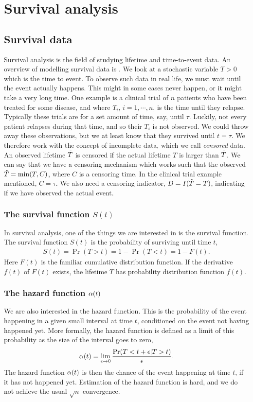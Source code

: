 \chapter{Survival analysis}

\section{Survival data}
Survival analysis is the field of studying lifetime and time-to-event data. An overview of modelling survival data is \citet{ABG}. We look at a stochastic variable $T>0$ which is the time to event. To observe such data in real life, we must wait until the event actually happens. This might in some cases never happen, or it might take a very long time. One example is a clinical trial of $n$ patients who have been treated for some disease, and where $T_i$, $i=1,\cdots,n$, is the time until they relapse. Typically these trials are for a set amount of time, say, until $\tau$. Luckily, not every patient relapses during that time, and so their $T_i$ is not observed. We could throw away these observations, but we at least know that they survived until $t=\tau$. We therefore work with the concept of incomplete data, which we call \textit{censored} data. An observed lifetime $\tilde{T}$ is censored if the actual lifetime $T$ is larger than $\tilde{T}$. We can say that we have a censoring mechanism which works such that the observed $\tilde{T}=\min(T, C)$, where $C$ is a censoring time. In the clinical trial example mentioned, $C=\tau$. We also need a censoring indicator, $D=I(\tilde{T}=T)$, indicating if we have observed the actual event.

\subsection{The survival function $S(t)$}
In survival analysis, one of the things we are interested in is the survival function. The survival function $S(t)$ is the probability of surviving until time $t$,
\begin{align*}
    S(t)=\Pr(T>t)=1-\Pr(T<t)=1-F(t).
\end{align*}
Here $F(t)$ is the familiar cumulative distribution function. If the derivative $f(t)$ of $F(t)$ exists, the lifetime $T$ has probability distribution function $f(t)$.

\subsection{The hazard function $\alpha(t)$}
We are also interested in the hazard function. This is the probability of the event happening in a given small interval at time $t$, conditioned on the event not having happened yet. More formally, the hazard function is defined as a limit of this probability as the size of the interval goes to zero,
\begin{equation*}
    \alpha(t)=\lim_{\epsilon\to0}\frac{\Pr(T<t+\epsilon|T>t)}{\epsilon}.
\end{equation*}
The hazard function $\alpha(t)$ is then the chance of the event happening at time $t$, if it has not happened yet. Estimation of the hazard function is hard, and we do not achieve the usual $\sqrt{n}$ convergence.

